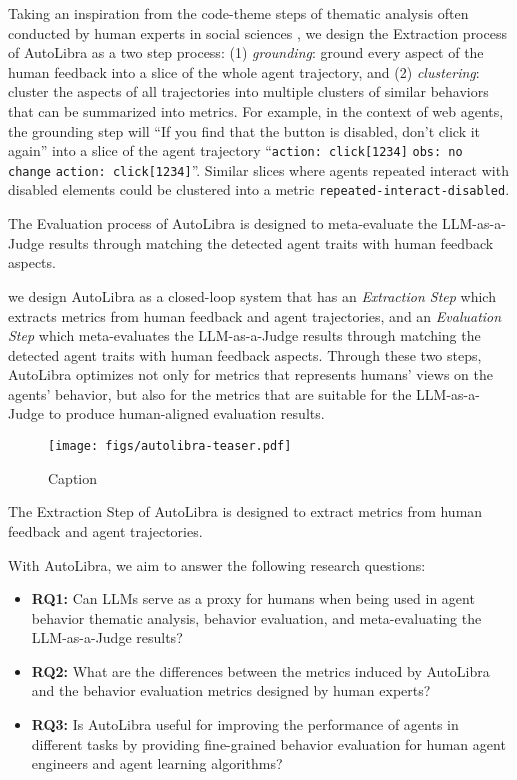 Taking an inspiration from the code-theme steps of thematic analysis often conducted by human experts in social sciences \citep{braun2006using},
we design the Extraction process of AutoLibra as a two step process:
(1) \emph{grounding}: ground every aspect of the human feedback into a slice of the whole agent trajectory,
and (2) \emph{clustering}: cluster the aspects of all trajectories into multiple clusters of similar behaviors
that can be summarized into metrics. For example, in the context of web agents, the grounding step will
``\textsf{If you find that the button is disabled, don't click it again}'' into a slice of the agent trajectory
``\texttt{action: click[1234]} \texttt{obs: no change} \texttt{action: click[1234]}''. Similar slices where 
agents repeated interact with disabled elements could be clustered into a metric \texttt{repeated-interact-disabled}. 

The Evaluation process of AutoLibra is designed to meta-evaluate the LLM-as-a-Judge results
through matching the detected agent traits with human feedback aspects.


we design AutoLibra as a closed-loop system
that has an \emph{Extraction Step} which extracts metrics from human feedback and agent trajectories,
and an \emph{Evaluation Step} which meta-evaluates the LLM-as-a-Judge results
through matching the detected agent traits with human feedback aspects. 
Through these two steps, AutoLibra optimizes not only for metrics that represents humans' views on the
agents' behavior, but also for the metrics that are suitable for the LLM-as-a-Judge to produce human-aligned
evaluation results.

\begin{wrapfigure}{r}{0.7\textwidth}
    \centering
    \texttt{[image: figs/autolibra-teaser.pdf]}
    \caption{Caption}
    \label{fig:enter-label}
\end{wrapfigure}

The Extraction Step of AutoLibra is designed to extract metrics from human feedback and agent trajectories.


With AutoLibra, we aim to answer the following research questions:
\begin{itemize}
    \item \textbf{RQ1:} Can LLMs serve as a proxy for humans when being used in agent behavior thematic analysis,
    behavior evaluation, and meta-evaluating the LLM-as-a-Judge results?
    \item \textbf{RQ2:} What are the differences between the metrics induced by AutoLibra and the behavior evaluation
    metrics designed by human experts?
    \item \textbf{RQ3:} Is AutoLibra useful for improving the performance of agents in different tasks by 
    providing fine-grained behavior evaluation for human agent engineers and agent learning algorithms?
\end{itemize}


